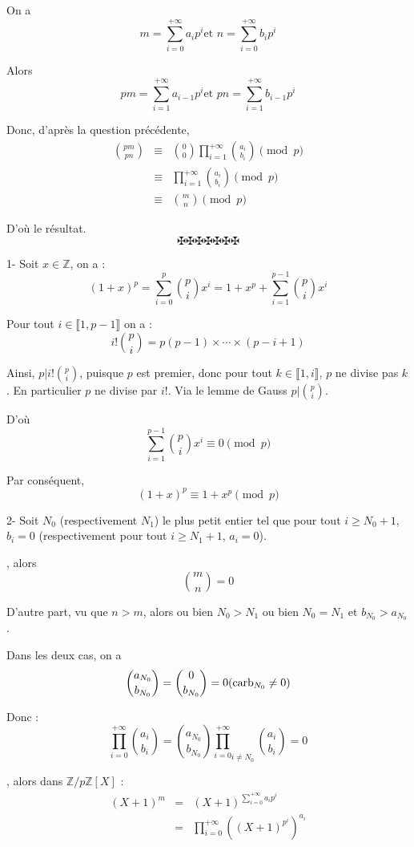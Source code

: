 On a
\[ m = \sum_{i = 0}^{+ \infty} a_i p^i  \text{et } n = \sum_{i = 0}^{+ \infty}
   b_i p^i \]


Alors
\[ pm = \sum_{i = 1}^{+ \infty} a_{i - 1} p^i  \text{et } pn = \sum_{i = 1}^{+
   \infty} b_{i - 1} p^i \]


Donc, d'apr{\`e}s la question pr{\'e}c{\'e}dente,
\begin{eqnarray*}
  \binom{pm}{pn} & \equiv & \binom{0}{0} \prod_{i = 1}^{+ \infty}
  \binom{a_i}{b_i} \pmod{p}\\
  & \equiv & \prod_{i = 1}^{+ \infty} \binom{a_i}{b_i} \pmod{p}\\
  & \equiv & \binom{m}{n} \pmod{p}
\end{eqnarray*}


D'o{\`u} le r{\'e}sultat.
\[ \maltese \maltese \maltese \maltese \maltese \maltese \maltese \]

1- Soit $x \in \mathbb{Z}$, on a :
\[ (1 + x)^p = \sum_{i = 0}^p \binom{p}{i} x^i = 1 + x^p + \sum_{i = 1}^{p -
   1} \binom{p}{i} x^i \]


Pour tout $i \in \llbracket 1, p - 1 \rrbracket$ on a :
\[ i! \binom{p}{i} = p (p - 1) \times \cdots \times (p - i + 1) \]


Ainsi, $p|i! \binom{p}{i}$, puisque $p$ est premier, donc pour tout $k \in
\llbracket 1, i \rrbracket$, $p$ ne divise pas $k$. En particulier $p$ ne
divise par $i$!. Via le lemme de Gauss $p| \binom{p}{i}$.

D'o{\`u}
\[ \sum_{i = 1}^{p - 1} \binom{p}{i} x^i \equiv 0 \pmod{p} \]


Par cons{\'e}quent,
\[ (1 + x)^p \equiv 1 + x^p \pmod{p} \]


2- Soit $N_0$ (respectivement $N_1$) le plus petit entier tel que pour tout $i
\geqslant N_0 + 1$, $b_i = 0$ (respectivement pour tout $i \geqslant N_1 + 1$,
$a_i = 0$).

, alors
\[ \binom{m}{n} = 0 \]


D'autre part, vu que $n > m$, alors ou bien $N_0 > N_1$ ou bien $N_0 = N_1$ et
$b_{N_0} > a_{N_0}$.

Dans les deux cas, on a
\[ \binom{a_{N_0}}{b_{N_0}} = \binom{0}{b_{N_0}} = 0 (\operatorname{carb}_{N_0} \neq
   0) \]


Donc :
\[ \prod_{i = 0}^{+ \infty} \binom{a_i}{b_i} = \binom{a_{N_0}}{b_{N_0}}
   {\prod_{i = 0}^{+ \infty}}_{i \neq N_0} \binom{a_i}{b_i} = 0 \]


, alors dans $\mathbb{Z}/ p\mathbb{Z}[X]$ :
\begin{eqnarray*}
  (X + 1)^m & = & (X + 1)^{\sum_{i = 0}^{+ \infty} a_i p^i}\\
  & = & \prod^{+ \infty}_{i = 0} ((X + 1)^{p^i})^{a_i}
\end{eqnarray*}


